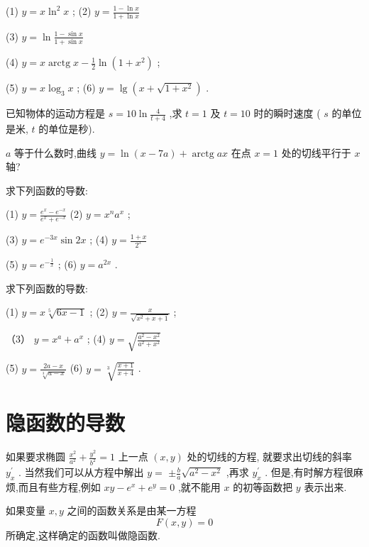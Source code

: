 \documentclass[lang=cn,newtx,10pt,scheme=chinese]{elegantbook}
\begin{document}
\begin{problemset}[习 题 六]
(1) \(y = x{\ln }^{2}x\) ; (2) \(y = \frac{1 - \ln x}{1 + \ln x}\)

(3) \(y = \ln \frac{1 - \sin x}{1 + \sin x}\)

(4) \(y = x\operatorname{arctg}x - \frac{1}{2}\ln \left( {1 + {x}^{2}}\right)\) ;

(5) \(y = x{\log }_{3}x\) ; (6) \(y = \lg \left( {x + \sqrt{1 + {x}^{2}}}\right)\) .

\item 已知物体的运动方程是 \(s = {10}\ln \frac{4}{t + 4}\) ,求 \(t = 1\) 及 \(t = {10}\) 时的瞬时速度 ( \(s\) 的单位是米, \(t\) 的单位是秒).

\item \(a\) 等于什么数时,曲线 \(y = \ln \left( {x - {7a}}\right) + \operatorname{arctg}{ax}\) 在点 \(x = 1\) 处的切线平行于 \(x\) 轴?

\item 求下列函数的导数:

(1) \(y = \frac{{e}^{x} - {e}^{-x}}{{e}^{x} + {e}^{-x}}\) (2) \(y = {x}^{n}{a}^{x}\) ;

(3) \(y = {e}^{-{3x}}\sin {2x}\) ; (4) \(y = \frac{1 + x}{{2}^{x}}\)

(5) \(y = {e}^{-\frac{1}{x}}\) ; (6) \(y = {a}^{2x}\) .

\item 求下列函数的导数:

(1) \(y = x\sqrt[5]{{6x} - 1}\) ; (2) \(y = \frac{x}{\sqrt{{x}^{2} + x + 1}}\) ;

（3） \(y = {x}^{a} + {a}^{x}\) ; (4) \(y = \sqrt{\frac{{a}^{2} - {x}^{2}}{{a}^{2} + {x}^{2}}}\)

(5) \(y = \frac{{2a} - x}{\sqrt[3]{a - x}}\) (6) \(y = \sqrt[3]{\frac{x + 1}{x + 4}}\) .

\end{problemset}

\section{隐函数的导数}

如果要求椭圆 \(\frac{{x}^{2}}{{a}^{2}} + \frac{{y}^{2}}{{b}^{2}} = 1\) 上一点 \(\left( {x,y}\right)\) 处的切线的方程, 就要求出切线的斜率 \({y}_{x}^{\prime }\) . 当然我们可以从方程中解出 \(y =\) \(\pm \frac{b}{a}\sqrt{{a}^{2} - {x}^{2}}\) ,再求 \({y}_{x}^{\prime }\) . 但是,有时解方程很麻烦,而且有些方程,例如 \({xy} - {e}^{x} + {e}^{y} = 0\) ,就不能用 \(x\) 的初等函数把 \(y\) 表示出来.

\begin{definition}[隐函数]

如果变量 \(x,y\) 之间的函数关系是由某一方程
\[
	F\left( {x,y}\right) = 0
\]
所确定,这样确定的函数叫做隐函数.

\end{definition}
\end{document}
